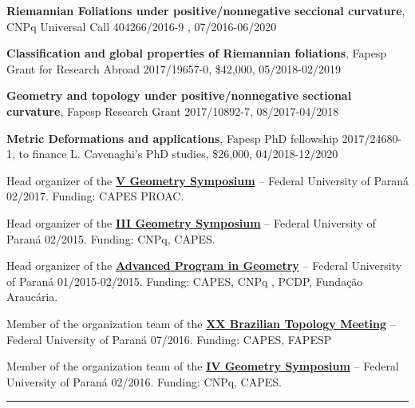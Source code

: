 \documentclass[10pt]{article}
\newenvironment{innerlist}[1][\enskip\textbullet]%
{\begin{compactitem}[#1]}{\end{compactitem}}
\begin{document}
	\vspace{0.5em}
	\begin{innerlist}[-]
		
\item 	\textbf{Riemannian Foliations under positive/nonnegative seccional curvature}, CNPq Universal Call 404266/2016-9 , 07/2016-06/2020
	
	
\item 	\textbf{Classification and global properties of Riemannian foliations}, Fapesp Grant for Research Abroad 2017/19657-0, \$42,000,  05/2018-02/2019
	
	
\item 	\textbf{Geometry and topology under positive/nonnegative sectional curvature}, Fapesp Research Grant  2017/10892-7,  08/2017-04/2018
	
\item 	\textbf{Metric Deformations and applications}, Fapesp PhD fellowship 2017/24680-1, to finance L. Cavenaghi's PhD studies, \$26,000, 04/2018-12/2020 
	
		\item 
Head  organizer of the \href{http://www.matematica.ufpr.br/old/verao/2017/m4_geometria.html}{\textbf{V Geometry Symposium}} -- Federal University of Paraná 02/2017.  Funding: CAPES PROAC. 
	\item Head organizer of the \href{http://www.matematica.ufpr.br/old/verao/2015/m4_geometria.html}{\textbf{III Geometry Symposium}} -- Federal University of Paraná 02/2015. Funding: CNPq, CAPES.
\item  Head organizer of the \href{https://geometriatopologiaufpr.wordpress.com/programa-avancado-de-verao-em-geometria/}{\textbf{Advanced Program in Geometry}} -- Federal University of Paraná 01/2015-02/2015. Funding: CAPES, CNPq ,  PCDP, Fundação Araucária. 
	\item Member of the organization team of the \href{http://www.20ebt.ufpr.br}{\textbf{XX Brazilian Topology Meeting}} -- Federal University of Paraná 07/2016. Funding: CAPES, FAPESP
	\item Member of the organization team of the \href{http://www.matematica.ufpr.br/old/verao/2016/m4_geometria.html}{\textbf{IV Geometry Symposium}} -- Federal University of Paraná 02/2016. Funding: CNPq, CAPES. 
	\end{innerlist}
	
	
	\rule{\columnwidth}{.5pt}%
	
	\vspace{-1em}
	
	
	
\end{document}
